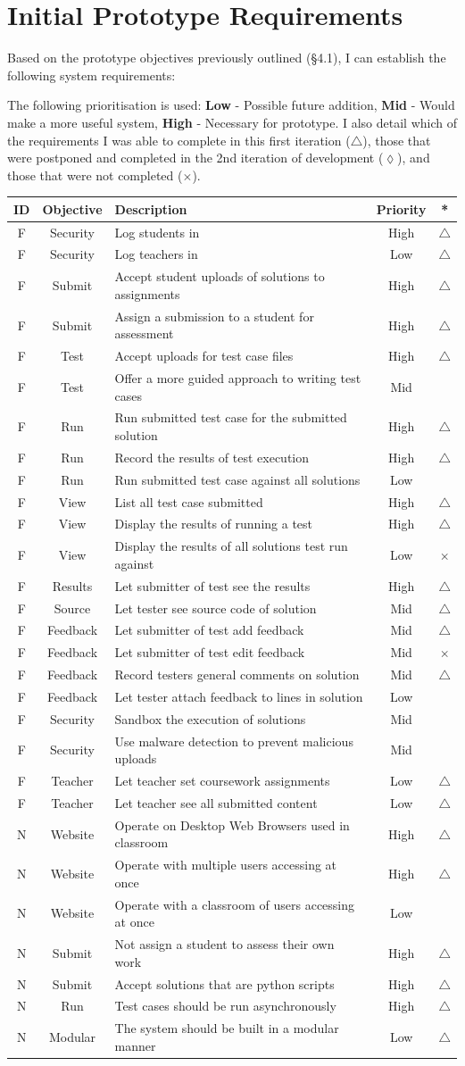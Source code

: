 \documentclass[a4paper,11pt]{report}
\newcounter{FunCount}
\newcounter{NFunCount}
\newcommand{\freq}[4]{\addtocounter{FunCount}{1}F\arabic{FunCount} & #1 & #2 & #3 & #4\\}
\newcommand{\nfreq}[4]{\addtocounter{NFunCount}{1}N\arabic{NFunCount} & #1 & #2 & #3 & #4\\}
\begin{document}
\section{Initial Prototype Requirements}
\label{sec:req1}
Based on the  prototype objectives previously outlined (\S4.1), I can establish the following system requirements:\par
The following prioritisation is used: \textbf{Low} - Possible future addition, \textbf{Mid} - Would make a more useful system, \textbf{High} - Necessary for prototype.
I also detail which of the requirements I was able to complete in this first iteration ($\triangle$), those that were postponed and completed in the 2nd iteration of development ($\lozenge$), and those that were not completed ($\times$).
\begin{longtable}{ccl@{}cc}
\textbf{ID} & \textbf{Objective} & \textbf{Description} & \textbf{Priority} & \textbf{*} \\\hline
\freq{Security}{Log students in}{High}{$\triangle$}
\freq{Security}{Log teachers in}{Low}{$\triangle$}
\freq{Submit}{Accept student uploads of solutions to assignments}{High}{$\triangle$}
\freq{Submit}{Assign a submission to a student for assessment}{High}{$\triangle$}
\freq{Test}{Accept uploads for test case files}{High}{$\triangle$}
\freq{Test}{Offer a more guided approach to writing test cases}{Mid}{}
\freq{Run}{Run submitted test case for the submitted solution}{High}{$\triangle$}
\freq{Run}{Record the results of test execution}{High}{$\triangle$}
\freq{Run}{Run submitted test case against all solutions}{Low}{}
\freq{View}{List all test case submitted}{High}{$\triangle$}
\freq{View}{Display the results of running a test}{High}{$\triangle$}
\freq{View}{Display the results of all solutions test run against}{Low}{$\times$}
\freq{Results}{Let submitter of test see the results}{High}{$\triangle$}
\freq{Source}{Let tester see source code of solution}{Mid}{$\triangle$}
\freq{Feedback}{Let submitter of test add feedback}{Mid}{$\triangle$}
\freq{Feedback}{Let submitter of test edit feedback}{Mid}{$\times$}
\freq{Feedback}{Record testers general comments on solution}{Mid}{$\triangle$}
\freq{Feedback}{Let tester attach feedback to lines in solution}{Low}{}
\freq{Security}{Sandbox the execution of solutions}{Mid}{}
\freq{Security}{Use malware detection to prevent malicious uploads}{Mid}{}
\freq{Teacher}{Let teacher set coursework assignments}{Low}{$\triangle$}
\freq{Teacher}{Let teacher see all submitted content}{Low}{$\triangle$}
\nfreq{Website}{Operate on Desktop Web Browsers used in classroom}{High}{$\triangle$}
\nfreq{Website}{Operate with multiple users accessing at once}{High}{$\triangle$}
\nfreq{Website}{Operate with a classroom of users accessing at once}{Low}{}
\nfreq{Submit}{Not assign a student to assess their own work}{High}{$\triangle$}
\nfreq{Submit}{Accept solutions that are python scripts}{High}{$\triangle$}
\nfreq{Run}{Test cases should be run asynchronously}{High}{$\triangle$}
\nfreq{Modular}{The system should be built in a modular manner}{Low}{$\triangle$}
\end{longtable}
\end{document}
